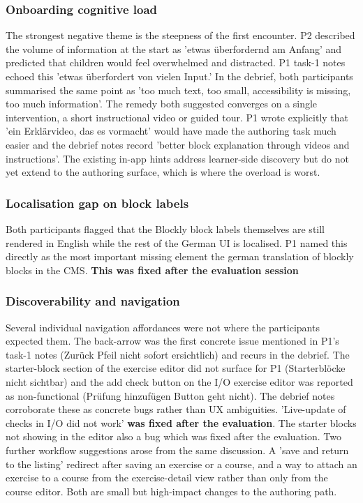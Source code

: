\subsubsection*{Onboarding cognitive load}
The strongest negative theme is the steepness of the first encounter. P2 described the volume of information at 
the start as 'etwas überfordernd am Anfang' and predicted that children
would feel overwhelmed and distracted. P1 task-1 notes echoed this 'etwas überfordert von vielen Input.' 
In the debrief, both participants summarised the same point as 'too much text, too small, accessibility is missing, 
too much information'. The remedy both suggested converges on a single intervention, a short instructional
video or guided tour. P1 wrote explicitly that 'ein Erklärvideo, das es vormacht' would have made the authoring 
task much easier and the debrief notes record
'better block explanation through videos and instructions'. The existing in-app hints address learner-side discovery 
but do not yet extend to the authoring surface, which is where the overload is worst.

\subsubsection*{Localisation gap on block labels}
Both participants flagged that the Blockly block labels themselves
are still rendered in English while the rest of the German UI is
localised. P1 named this directly as the most important missing element the german translation of blockly blocks in the CMS.
\textbf{This was fixed after the evaluation session}

\subsubsection*{Discoverability and navigation}
Several individual navigation affordances were not where the
participants expected them. The back-arrow was the first concrete
issue mentioned in P1's task-1 notes (Zurück Pfeil nicht sofort
ersichtlich) and recurs in the debrief. The starter-block section of the exercise editor
did not surface for P1 (Starterblöcke nicht sichtbar) and the
add check button on the I/O exercise editor was reported as
non-functional (Prüfung hinzufügen Button geht nicht). The
debrief notes corroborate these as concrete bugs rather than UX
ambiguities. 'Live-update of checks in I/O did not work' \textbf{was fixed after the evaluation}.
The starter blocks not showing in the editor also a bug which was fixed after the evaluation.
Two further workflow suggestions arose from the same
discussion. A 'save and return to the listing' redirect after
saving an exercise or a course, and a way to attach an exercise to
a course from the exercise-detail view rather than only from the
course editor. Both are small but high-impact changes to the
authoring path.


